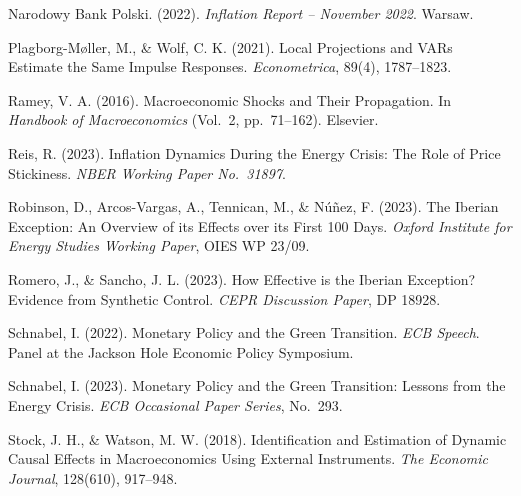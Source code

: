 \documentclass[12pt, a4paper]{article}
\begin{document}
\hangindent=0.5cm Narodowy Bank Polski. (2022). \textit{Inflation Report -- November 2022}. Warsaw.

\hangindent=0.5cm Plagborg-M{\o}ller, M., \& Wolf, C. K. (2021). Local Projections and VARs Estimate the Same Impulse Responses. \textit{Econometrica}, 89(4), 1787--1823.

\hangindent=0.5cm Ramey, V. A. (2016). Macroeconomic Shocks and Their Propagation. In \textit{Handbook of Macroeconomics} (Vol.\ 2, pp.\ 71--162). Elsevier.

\hangindent=0.5cm Reis, R. (2023). Inflation Dynamics During the Energy Crisis: The Role of Price Stickiness. \textit{NBER Working Paper No.\ 31897}.

\hangindent=0.5cm Robinson, D., Arcos-Vargas, A., Tennican, M., \& N\'{u}\~{n}ez, F. (2023). The Iberian Exception: An Overview of its Effects over its First 100 Days. \textit{Oxford Institute for Energy Studies Working Paper}, OIES WP 23/09.

\hangindent=0.5cm Romero, J., \& Sancho, J. L. (2023). How Effective is the Iberian Exception? Evidence from Synthetic Control. \textit{CEPR Discussion Paper}, DP 18928.

\hangindent=0.5cm Schnabel, I. (2022). Monetary Policy and the Green Transition. \textit{ECB Speech}. Panel at the Jackson Hole Economic Policy Symposium.

\hangindent=0.5cm Schnabel, I. (2023). Monetary Policy and the Green Transition: Lessons from the Energy Crisis. \textit{ECB Occasional Paper Series}, No.\ 293.

\hangindent=0.5cm Stock, J. H., \& Watson, M. W. (2018). Identification and Estimation of Dynamic Causal Effects in Macroeconomics Using External Instruments. \textit{The Economic Journal}, 128(610), 917--948.
\end{document}
